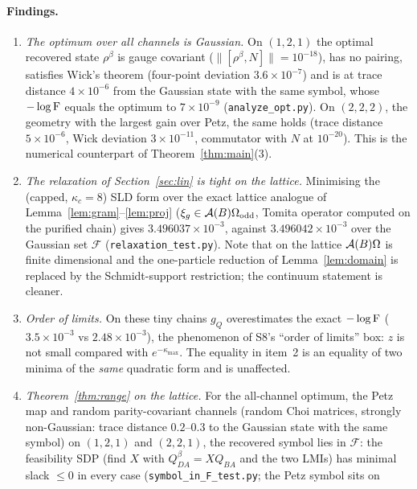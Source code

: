 \documentclass[11pt,a4paper]{article}
\begin{document}
\paragraph{Findings.}
\begin{enumerate}[leftmargin=1.6em,itemsep=1pt]
\item \emph{The optimum over all channels is Gaussian.}  On \((1,2,1)\) the optimal recovered state
\(\rho^\beta\) is gauge covariant (\(\|[\rho^\beta,N]\|=10^{-18}\)), has no pairing, satisfies Wick's
theorem (four-point deviation \(3.6\times10^{-7}\)) and is at trace distance \(4\times10^{-6}\) from
the Gaussian state with the same symbol, whose \(-\log\operatorname{F}\) equals the optimum to \(7\times10^{-9}\)
(\texttt{analyze\_opt.py}).  On \((2,2,2)\), the geometry with the largest gain over Petz, the same holds (trace distance
\(5\times10^{-6}\), Wick deviation \(3\times10^{-11}\), commutator with \(N\) at \(10^{-20}\)).  This is
the numerical counterpart of Theorem~\ref{thm:main}(3).
\item \emph{The relaxation of Section~\ref{sec:lin} is tight on the lattice.}  Minimising the (capped,
\(\kappa_c=8\)) SLD form over the exact lattice analogue of Lemma~\ref{lem:gram}--\ref{lem:proj}
(\(\xi_g\in\mathcal A(B)\Omega_{\mathrm{odd}}\), Tomita operator computed on the purified chain) gives
\(3.496037\times10^{-3}\), against \(3.496042\times10^{-3}\) over the Gaussian set \(\mathcal F\)
(\texttt{relaxation\_test.py}).  Note that on the lattice \(\mathcal A(B)\Omega\) is finite dimensional and the
one-particle reduction of Lemma~\ref{lem:domain} is replaced by the Schmidt-support restriction; the
continuum statement is cleaner.
\item \emph{Order of limits.}  On these tiny chains \(g_Q\) overestimates the exact \(-\log\operatorname{F}\)
(\(3.5\times10^{-3}\) vs \(2.48\times10^{-3}\)), the phenomenon of S8's ``order of limits'' box:
\(z\) is not small compared with \(e^{-\kappa_{\max}}\).  The equality in item~2 is an equality of two
minima of the \emph{same} quadratic form and is unaffected.
\item \emph{Theorem~\ref{thm:range} on the lattice.}  For the all-channel optimum, the Petz map and
random parity-covariant channels (random Choi matrices, strongly non-Gaussian: trace distance
\(0.2\)--\(0.3\) to the Gaussian state with the same symbol) on \((1,2,1)\) and \((2,2,1)\), the recovered
symbol lies in \(\mathcal F\): the feasibility SDP (find \(X\) with \(Q^\beta_{DA}=XQ_{BA}\) and the two
LMIs) has minimal slack \(\le0\) in every case (\texttt{symbol\_in\_F\_test.py}; the Petz symbol sits on

\end{enumerate}
\end{document}
